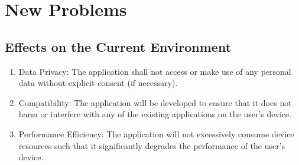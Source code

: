 \documentclass[12pt]{article}
\begin{document}
\section{New Problems}
\subsection{Effects on the Current Environment}
\begin{enumerate}
  \item Data Privacy: The application shall not access or make use of any personal data 
  without explicit consent (if necessary).
  \item Compatibility:  The application will be developed to ensure that it does not harm or 
  interfere with any of the existing applications on the user’s device.
  \item Performance Efficiency: The application will not excessively consume device resources 
  such that it significantly degrades the performance of the user’s device.
\end{enumerate}
\end{document}
